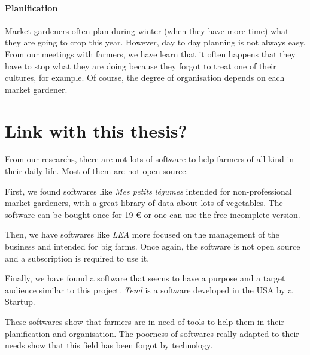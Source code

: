 \paragraph{Planification} Market gardeners often plan during winter (when they have more time) what they are going to crop this year. However, day to day planning is not always easy. From our meetings with farmers, we have learn that it often happens that they have to stop what they are doing because they forgot to treat one of their cultures, for example. Of course, the degree of organisation depends on each market gardener.

\section{Link with this thesis?}

From our researchs, there are not lots of software to help farmers of all kind in their daily life. Most of them are not open source.

First, we found softwares like \emph{Mes petits légumes}\cite{mespetitslegumes} intended for non-professional market gardeners, with a great library of data about lots of vegetables. The software can be bought once for 19 \euro{} or one can use the free incomplete version.



Then, we have softwares like \emph{LEA}\cite{lea-agri} more focused on the management of the business and intended for big farms. Once again, the software is not open source and a subscription is required to use it.

Finally, we have found a software that seems to have a purpose and a target audience similar to this project. \emph{Tend}\cite{tend} is a software developed in the USA by a Startup.

These softwares show that farmers are in need of tools to help them in their planification and organisation. The poorness of softwares really adapted to their needs show that this field has been forgot by technology.

